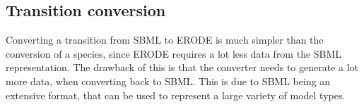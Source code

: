 %    
    


\subsection{Transition conversion}
Converting a transition from SBML to ERODE is much simpler than the conversion of a species, since ERODE requires a lot less data from the SBML representation. The drawback of this is that the converter needs to generate a lot more data, when converting back to SBML. This is due to SBML being an extensive format, that can be used to represent a large variety of model types.

